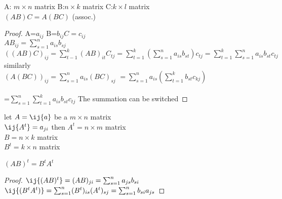 \documentclass{article}
\newcommand{\mn}{m \times n}
\begin{document}
\begin{theorem}
    A: $\mn $ matrix B:$n\times k $ matrix C:$k \times l$ matrix\\
    $(AB)C=A(BC)$ (assoc.)
\end{theorem}
\begin{proof}
    A=$a_{ij}$ B=$b_{ij} C=c_{ij}$\\
    $AB_{ij}=\sum_{s=1}^n a_{is}b_{sj}$
    $((AB)C)_{ij}=\sum_{t-1}^k (AB)_{it}C_{tj}=\sum_{t=1}^k(\sum_{s=1}^n a_{is}b_{st})c_{tj}=\sum_{t=1}^k\sum_{s=1}^n a_{is}b_{st}c_{tj}$\\
    similarly\\
    $(A(BC))_{ij}=\sum_{s=1}^na_{is}(BC)_{sj}$
    $=\sum_{s=1}^na_{is}(\sum_{t=1}^kb_{st}c_{kj})$\\
    \\=$\sum_{s=1}^n\sum_{t=1}^ka_{is}b_{st}c_{tj}$
The summation can be switched    
\end{proof}
let $A=\ij{a}$ be a $\mn $ matrix
\\$\ij{A^t}=a_{ji}$ then $A^t=n\times m$ matrix\\
$B=n\times k$ matrix\\
$B^t=k\times n$ matrix\\
\begin{theorem}
    $(AB)^t=B^tA^t$
\end{theorem}
\begin{proof}
    $\ij{(AB)^t}=(AB)_{ji}=\sum_{s=1}^n a_{js}b_{si}$\\
    $\ij{(B^tA^t)}=\sum_{s=1}^n (B^t)_{is}(A^t)_{sj}=\sum_{s=1}^n b_{si} a_{js}$
    
\end{proof}
\end{document}
